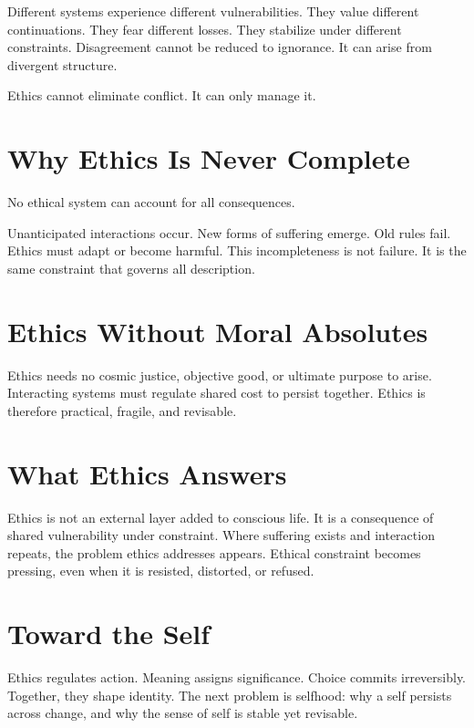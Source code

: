 \documentclass[11pt,twoside,openright]{book}
\begin{document}
Different systems experience different vulnerabilities. They value different continuations. They fear different losses. They stabilize under different constraints. Disagreement cannot be reduced to ignorance. It can arise from divergent structure.

Ethics cannot eliminate conflict. It can only manage it.

\section*{Why Ethics Is Never Complete}

No ethical system can account for all consequences.

Unanticipated interactions occur. New forms of suffering emerge. Old rules fail. Ethics must adapt or become harmful. This incompleteness is not failure. It is the same constraint that governs all description.

\section*{Ethics Without Moral Absolutes}

Ethics needs no cosmic justice, objective good, or ultimate purpose to arise. Interacting systems must regulate shared cost to persist together. Ethics is therefore practical, fragile, and revisable.

\section*{What Ethics Answers}

Ethics is not an external layer added to conscious life. It is a consequence of shared vulnerability under constraint. Where suffering exists and interaction repeats, the problem ethics addresses appears. Ethical constraint becomes pressing, even when it is resisted, distorted, or refused.

\section*{Toward the Self}

Ethics regulates action. Meaning assigns significance. Choice commits irreversibly. Together, they shape identity. The next problem is selfhood: why a self persists across change, and why the sense of self is stable yet revisable.
\end{document}
